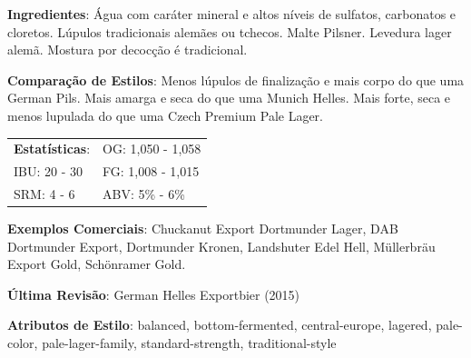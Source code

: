 \textbf{Ingredientes}: Água com caráter mineral e altos níveis de sulfatos, carbonatos e cloretos. Lúpulos tradicionais alemães ou tchecos. Malte Pilsner. Levedura lager alemã. Mostura por decocção é tradicional.

\textbf{Comparação de Estilos}: Menos lúpulos de finalização e mais corpo do que uma German Pils. Mais amarga e seca do que uma Munich Helles. Mais forte, seca e menos lupulada do que uma Czech Premium Pale Lager.

\begin{tabular}{@{}p{35mm}p{35mm}@{}}
  \textbf{Estatísticas}: & OG: 1,050 - 1,058 \\
  IBU: 20 - 30  & FG: 1,008 - 1,015  \\
  SRM: 4 - 6  & ABV: 5\% - 6\%
\end{tabular}

\textbf{Exemplos Comerciais}: Chuckanut Export Dortmunder Lager, DAB Dortmunder Export, Dortmunder Kronen, Landshuter Edel Hell, Müllerbräu Export Gold, Schönramer Gold.

\textbf{Última Revisão}: German Helles Exportbier (2015)

\textbf{Atributos de Estilo}: balanced, bottom-fermented, central-europe, lagered, pale-color, pale-lager-family, standard-strength, traditional-style

